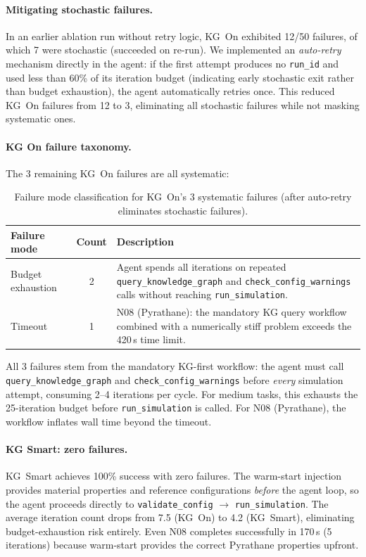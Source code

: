\documentclass[preprint,review,12pt]{elsarticle}
\begin{document}
\paragraph{Mitigating stochastic failures.}
In an earlier ablation run without retry logic, KG~On exhibited 12/50
failures, of which 7 were stochastic (succeeded on re-run).  We
implemented an \emph{auto-retry} mechanism directly in the agent:
if the first attempt produces no \texttt{run\_id} and used less than
60\% of its iteration budget (indicating early stochastic exit rather
than budget exhaustion), the agent automatically retries once.
This reduced KG~On failures from 12 to 3, eliminating all stochastic
failures while not masking systematic ones.

\paragraph{KG On failure taxonomy.}
The 3 remaining KG~On failures are all systematic:

\begin{table}[htbp]
\centering\footnotesize
\caption{Failure mode classification for KG~On's 3 systematic failures
  (after auto-retry eliminates stochastic failures).}
\label{tab:failure-modes}
\setlength{\tabcolsep}{4pt}
\begin{tabular}{lcp{5.2cm}}
\toprule
Failure mode & Count & Description \\
\midrule
Budget exhaustion  & 2 &
  Agent spends all iterations on repeated
  \texttt{query\_knowledge\_graph} and
  \texttt{check\_config\_warnings} calls without
  reaching \texttt{run\_simulation}. \\
\addlinespace
Timeout & 1 &
  N08 (Pyrathane): the mandatory KG query workflow
  combined with a numerically stiff problem exceeds the
  420\,s time limit. \\
\bottomrule
\end{tabular}
\end{table}

All 3 failures stem from the mandatory KG-first workflow: the agent
must call \texttt{query\_knowledge\_graph} and
\texttt{check\_config\_warnings} before \emph{every} simulation attempt,
consuming 2--4 iterations per cycle.  For medium tasks, this exhausts
the 25-iteration budget before \texttt{run\_simulation} is called.
For N08 (Pyrathane), the workflow inflates wall time beyond the timeout.

\paragraph{KG Smart: zero failures.}
KG~Smart achieves 100\% success with zero failures.  The warm-start
injection provides material properties and reference configurations
\emph{before} the agent loop, so the agent proceeds directly to
\texttt{validate\_config} $\to$ \texttt{run\_simulation}.  The average
iteration count drops from 7.5 (KG~On) to 4.2 (KG~Smart), eliminating
budget-exhaustion risk entirely.  Even N08 completes successfully in
170\,s (5 iterations) because warm-start provides the correct Pyrathane
properties upfront.
\end{document}
